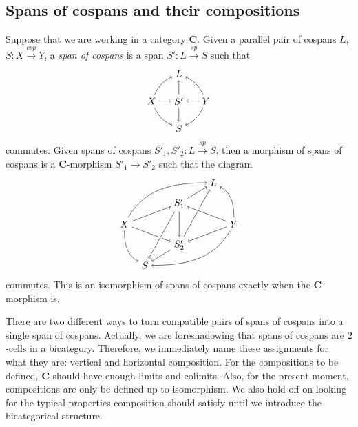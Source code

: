 \documentclass{tac}
\newcommand{\cat}[1]{\mathbf{#1}}
\newcommand{\from}{\colon}
\renewcommand{\span}{\xrightarrow{\mathit{sp}}}
\newcommand{\cospan}{\xrightarrow{\mathit{csp}}}
\begin{document}
\subsection{Spans of cospans and their compositions}
\label{sec:SpCspCompose}

Suppose that we are working in a category $\cat{ C }$. 
Given a parallel pair of cospans 
	$ L $, $ S \from X \cospan Y $, 
a \emph{span of cospans} is a span 
	$ S ' \from L \span S $ 
such that
\[
	\begin{tikzpicture}
	\node (a) at (0,1) {$L$};
	\node (b) at (1,0) {$Y$};
	\node (c) at (0,-1) {$S$};
	\node (d) at (-1,0) {$X$};
	\node (e) at (0,0) {$S'$};
	\draw [<-] (a) edge[bend left=20] (b);
	\draw [->] (b) edge[bend left=20] (c);
	\draw [<-] (c) edge[bend left=20] (d);
	\draw [->] (d) edge[bend left=20] (a);
	\draw [<-] (a) edge (e);
	\draw [->] (b) edge (e);
	\draw [<-] (c) edge (e);
	\draw [->] (d) edge (e);
	\end{tikzpicture}
\]
commutes. Given spans of cospans 
	$ S '_1 , S '_2 \from L \span S $, 
then a morphism of spans of cospans 
is a $\cat{C}$-morphism 
	$ S '_1 \to S '_2 $ 
such that the diagram
	\begin{equation} \label{diag.2-cell iso}
		\begin{tikzpicture}
		\node (X) at (-2,0) {$X$};
		\node (L) at (1.25,1.5) {$L$};
		\node (Y) at (2,0) {$Y$};
		\node (S) at (-1.25,-1.5) {$S$};
		\node (S'1) at (0,0.75) {$S'_1$};
		\node (S'2) at (0,-0.75) {$S'_2$};
		\draw [->] (X) edge[in=180,out=60] (L);
		\draw [->] (X) edge[] (S'1);
		\draw [->] (X) edge[] (S'2);
		\draw [->] (X) edge[out=-90,in=150] (S);
		\draw [->] (Y) edge[out=90,in=-30] (L);
		\draw [->] (Y) edge[] (S'2);
		\draw [->] (Y) edge[out=-120,in=0] (S);
		\draw [->] (S'1) edge[] (L);
		\draw [->] (S'1) edge[white,line width=3.5pt] (S);
		\draw [->] (S'1) edge[] (S);
		\draw [->] (S'1) edge[] (S'2);
		\draw [->] (S'2) edge[] (L);
		\draw [->] (S'2) edge[] (S);
		\draw [->] (Y) edge[white,line width=3.5pt] (S'1);
		\draw [->] (Y) edge[] (S'1);
		\end{tikzpicture}
	\end{equation}
commutes. This is an isomorphism of 
spans of cospans exactly when 
the  $\cat{ C }$-morphism is.
 
There are two different ways to turn 
compatible pairs of spans of cospans into 
a single span of cospans.  
Actually, we are foreshadowing that 
spans of cospans are $2$-cells in a bicategory. 
Therefore, we immediately name these assignments 
for what they are: vertical and horizontal composition. 
For the compositions to be defined, $\cat{ C }$ 
should have enough limits and colimits. 
Also, for the present moment, compositions are 
only be defined up to isomorphism. 
We also hold off on looking for the typical properties
composition should satisfy until we introduce 
the bicategorical structure. 
\end{document}
